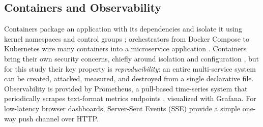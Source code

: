 \subsection{Containers and Observability}
\label{sec:bg-containers}
Containers package an application with its dependencies and isolate it using kernel
namespaces and control groups \cite{merkel2014,pahl2015}; orchestrators from Docker
Compose \cite{dockercompose} to Kubernetes \cite{burns2016} wire many containers into
a microservice application \cite{dragoni2017}. Containers bring their own security
concerns, chiefly around isolation and configuration \cite{combe2016,sultan2019}, but
for this study their key property is \emph{reproducibility}: an entire multi-service
system can be created, attacked, measured, and destroyed from a single declarative
file. Observability is provided by Prometheus, a pull-based time-series system that
periodically scrapes text-format metrics endpoints \cite{brazil2018}, visualized with
Grafana. For low-latency browser dashboards, Server-Sent Events (SSE) provide a simple
one-way push channel over HTTP.
